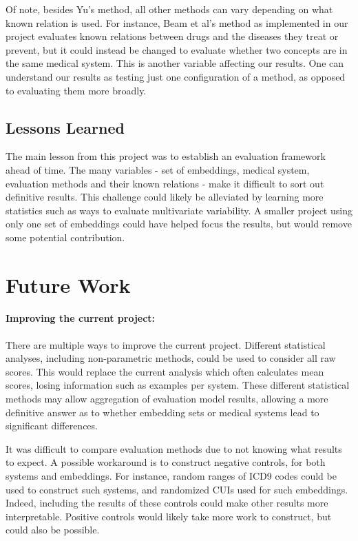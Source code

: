 \documentclass[11pt,a4paper]{article}
\begin{document}
Of note, besides Yu's method, all other methods can vary depending on what known relation is used. For instance, Beam et al's method as implemented in our project evaluates known relations between drugs and the diseases they treat or prevent, but it could instead be changed to evaluate whether two concepts are in the same medical system. This is another variable affecting our results. One can understand our results as testing just one configuration of a method, as opposed to evaluating them more broadly.

\subsection{Lessons Learned}
The main lesson from this project was to establish an evaluation framework ahead of time. The many variables - set of embeddings, medical system, evaluation methods and their known relations - make it difficult to sort out definitive results. This challenge could likely be alleviated by learning more statistics such as ways to evaluate multivariate variability. A smaller project using only one set of embeddings could have helped focus the results, but would remove some potential contribution. 

\section{Future Work}
\paragraph{Improving the current project:} There are multiple ways to improve the current project. Different statistical analyses, including non-parametric methods, could be used to consider all raw scores. This would replace the current analysis which often calculates mean scores, losing information such as examples per system. These different statistical methods may allow aggregation of evaluation model results, allowing a more definitive answer as to whether embedding sets or medical systems lead to significant differences.  

It was difficult to compare evaluation methods due to not knowing what results to expect. A possible workaround is to construct negative controls, for both systems and embeddings. For instance, random ranges of ICD9 codes could be used to construct such systems, and randomized CUIs used for such embeddings. Indeed, including the results of these controls could make other results more interpretable. Positive controls would likely take more work to construct, but could also be possible. 
\end{document}
